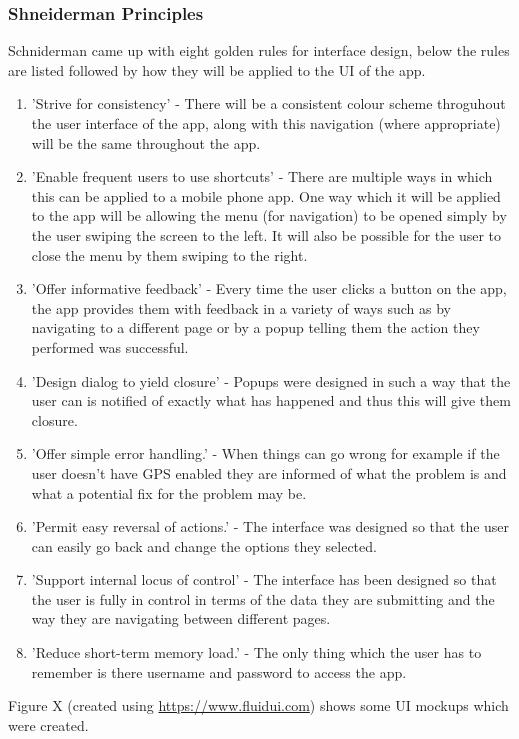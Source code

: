 \subsubsection{Shneiderman Principles} \cite{col}
Schniderman came up with eight golden rules for interface design, below the rules are listed followed by how they will be applied to the UI of the app. \cite{sch}
\begin{enumerate}
	\item 'Strive for consistency' - There will be a consistent colour scheme throguhout the user interface of the app, along with this navigation (where appropriate) will be the same throughout the app.
	\item 'Enable frequent users to use shortcuts' - There are multiple ways in which this can be applied to a mobile phone app. One way which it will be applied to the app will be allowing the menu (for navigation) to be opened simply by the user swiping the screen to the left. It will also be possible for the user to close the menu by them swiping to the right.
	\item 'Offer informative feedback' - Every time the user clicks a button on the app, the app provides them with feedback in a variety of ways such as by navigating to a different page or by a popup telling them the action they performed was successful.
	\item 'Design dialog to yield closure' - Popups were designed in such a way that the user can is notified of exactly what has happened and thus this will give them closure.
	\item 'Offer simple error handling.' - When things can go wrong for example if the user doesn't have GPS enabled they are informed of what the problem is and what a potential fix for the problem may be.
	\item 'Permit easy reversal of actions.' - The interface was designed so that the user can easily go back and change the options they selected.
	\item 'Support internal locus of control' - The interface has been designed so that the user is fully in control in terms of the data they are submitting and the way they are navigating between different pages.
	\item 'Reduce short-term memory load.' - The only thing which the user has to remember is there username and password to access the app.
\end{enumerate}
Figure X (created using \url {https://www.fluidui.com}) shows some UI mockups which were created.
